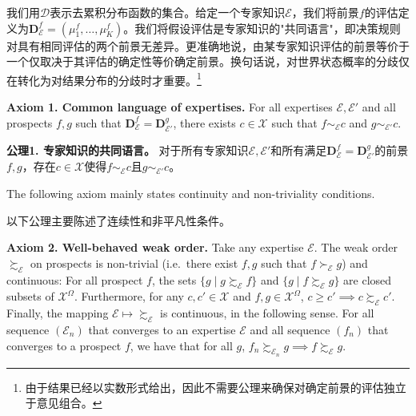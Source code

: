\documentclass[12pt,a4paper]{article}
\newenvironment{original}
  {\par\noindent\ignorespaces}
  {\par}
\newenvironment{translation}
  {\par\noindent{\color{transblue}\ignorespaces}}
  {\par\medskip}
\begin{document}
\begin{translation}
我们用$\mathcal{D}$表示去累积分布函数的集合。给定一个专家知识$\mathcal{E}$，我们将前景$f$的评估定义为$\mathbf{D}_{\mathcal{E}}^{f} = (\mu_{1}^{f}, \dots, \mu_{K}^{f})$。我们将假设评估是专家知识的"共同语言"，即决策规则对具有相同评估的两个前景无差异。更准确地说，由某专家知识评估的前景等价于一个仅取决于其评估的确定性等价确定前景。换句话说，对世界状态概率的分歧仅在转化为对结果分布的分歧时才重要。\footnote{由于结果已经以实数形式给出，因此不需要公理来确保对确定前景的评估独立于意见组合。}
\end{translation}

\begin{original}
\textbf{Axiom 1. Common language of expertises.} For all expertises $\mathcal{E}, \mathcal{E}'$ and all prospects $f, g$ such that $\mathbf{D}_{\mathcal{E}}^{f} = \mathbf{D}_{\mathcal{E}'}^{g}$, there exists $c \in \mathcal{X}$ such that $f \sim_{\mathcal{E}} c$ and $g \sim_{\mathcal{E}'} c$.
\end{original}

\begin{translation}
\textbf{公理1. 专家知识的共同语言。} 对于所有专家知识$\mathcal{E}, \mathcal{E}'$和所有满足$\mathbf{D}_{\mathcal{E}}^{f} = \mathbf{D}_{\mathcal{E}'}^{g}$的前景$f, g$，存在$c \in \mathcal{X}$使得$f \sim_{\mathcal{E}} c$且$g \sim_{\mathcal{E}'} c$。
\end{translation}

\begin{original}
The following axiom mainly states continuity and non-triviality conditions.
\end{original}

\begin{translation}
以下公理主要陈述了连续性和非平凡性条件。
\end{translation}

\begin{original}
\textbf{Axiom 2. Well-behaved weak order.} Take any expertise $\mathcal{E}$. The weak order $\succsim_{\mathcal{E}}$ on prospects is non-trivial (i.e.\ there exist $f, g$ such that $f \succ_{\mathcal{E}} g$) and continuous: For all prospect $f$, the sets $\{g \mid g \succsim_{\mathcal{E}} f\}$ and $\{g \mid f \succsim_{\mathcal{E}} g\}$ are closed subsets of $\mathcal{X}^{\Omega}$. Furthermore, for any $c, c' \in \mathcal{X}$ and $f, g \in \mathcal{X}^{\Omega}$, $c \geq c' \implies c \succsim_{\mathcal{E}} c'$. Finally, the mapping $\mathcal{E} \mapsto \succsim_{\mathcal{E}}$ is continuous, in the following sense. For all sequence $(\mathcal{E}_{n})$ that converges to an expertise $\mathcal{E}$ and all sequence $(f_{n})$ that converges to a prospect $f$, we have that for all $g$, $f_{n} \succsim_{\mathcal{E}_{n}} g \implies f \succsim_{\mathcal{E}} g$.
\end{original}
\end{document}
